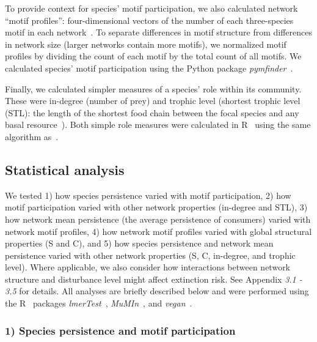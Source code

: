 \documentclass[12pt]{article}
\begin{document}
\begin{spacing}{2.0}
        
        To provide context for species' motif participation, we also calculated network ``motif profiles'': four-dimensional vectors of the number of each three-species motif in each network~\citep{Stouffer2012}.
        To separate differences in motif structure from differences in network size (larger networks contain more motifs), we normalized motif profiles by dividing the count of each motif by the total count of all motifs. 
		We calculated species' motif participation using the Python package \emph{pymfinder}~\citep{pymfinder}.


        Finally, we calculated simpler measures of a species' role within its community.
        These were in-degree (number of prey) and trophic level (shortest trophic level (STL): the length of the shortest food chain between the focal species and any basal resource~\citep{Williams2004}).
        Both simple role measures were calculated in R~\citep{R} using the same algorithm as~\citet{Eklof2013}.
        


	\subsection*{Statistical analysis} 

    	We tested 1) how species persistence varied with motif participation, 2) how motif participation varied with other network properties (in-degree and STL), 3) how network mean persistence (the average persistence of consumers) varied with network motif profiles, 4) how network motif profiles varied with global structural properties (S and C), and 5) how species persistence and network mean persistence varied with other network properties (S, C, in-degree, and trophic level).
        Where applicable, we also consider how interactions between network structure and disturbance level might affect extinction risk.
    	See Appendix \emph{3.1 - 3.5} for details. 
    	All analyses are briefly described below and were performed using the R~\citep{R} packages \emph{lmerTest}~\citep{lmerTest}, \emph{MuMIn}~\citep{MuMIn}, and \emph{vegan}~\citep{vegan}.

        
        \subsubsection*{1) Species persistence and motif participation}


\end{spacing}
\end{document}
